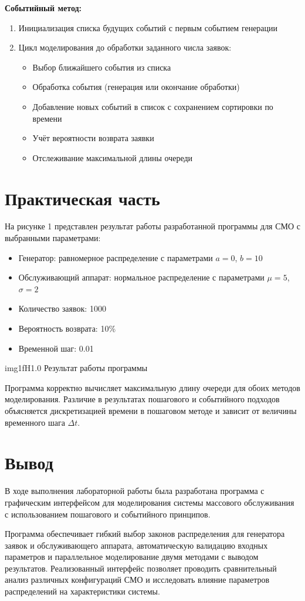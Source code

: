 \textbf{Событийный метод:}
\begin{enumerate}
    \item Инициализация списка будущих событий с первым событием генерации
    \item Цикл моделирования до обработки заданного числа заявок:
    \begin{itemize}
        \item Выбор ближайшего события из списка
        \item Обработка события (генерация или окончание обработки)
        \item Добавление новых событий в список с сохранением сортировки по времени
        \item Учёт вероятности возврата заявки
        \item Отслеживание максимальной длины очереди
    \end{itemize}
\end{enumerate}

\section{Практическая часть}

На рисунке 1 представлен результат работы разработанной программы для СМО с выбранными параметрами:

\begin{itemize}
    \item Генератор: равномерное распределение с параметрами $a = 0$, $b = 10$
    \item Обслуживающий аппарат: нормальное распределение с параметрами $\mu = 5$, $\sigma = 2$
    \item Количество заявок: 1000
    \item Вероятность возврата: 10\%
    \item Временной шаг: 0.01
\end{itemize}

	{img1}{f}{H}{1.0\textwidth}
	{Результат работы программы}

Программа корректно вычисляет максимальную длину очереди для обоих методов моделирования. Различие в результатах пошагового и событийного подходов объясняется дискретизацией времени в пошаговом методе и зависит от величины временного шага $\Delta t$.

\section{Вывод}

В ходе выполнения лабораторной работы была разработана программа с графическим интерфейсом для моделирования системы массового обслуживания с использованием пошагового и событийного принципов.

Программа обеспечивает гибкий выбор законов распределения для генератора заявок и обслуживающего аппарата, автоматическую валидацию входных параметров и параллельное моделирование двумя методами с выводом результатов. Реализованный интерфейс позволяет проводить сравнительный анализ различных конфигураций СМО и исследовать влияние параметров распределений на характеристики системы.
